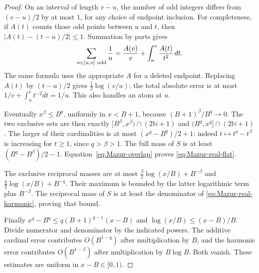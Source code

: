 \begin{proof}
On an interval of length \(v-u\), the number of odd integers differs
from \((v-u)/2\) by at most \(1\), for any choice of endpoint inclusion.
For completeness, if \(A(t)\) counts those odd points between \(u\)
and \(t\), then \(|A(t)-(t-u)/2|\le1\). Summation by parts gives
\[
 \sum_{n\in[u,v]\ {\rm odd}}\frac1n
 =\frac{A(v)}v+\int_u^v\frac{A(t)}{t^2}\,dt.
\]
The same formula uses the appropriate \(A\) for a deleted endpoint.
Replacing \(A(t)\) by \((t-u)/2\) gives
\(\tfrac12\log(v/u)\); the total absolute error is at most
\(1/v+\int_u^v t^{-2}dt=1/u\).
This also handles an atom at \(u\).

Eventually \(x^\beta\le B^q\), uniformly in \(x<B+1\), because
\((B+1)^\beta/B^q\to0\).
The two exclusive sets are then exactly
\([B^\beta,x^\beta)\cap(2\mathbb N+1)\) and
\((B^q,x^q]\cap(2\mathbb N+1)\).
The larger of their cardinalities is at most
\((x^q-B^q)/2+1\): indeed \(t\mapsto t^q-t^\beta\) is increasing
for \(t\ge1\), since \(q>\beta>1\).
The full mass of \(S\) is at least \((B^q-B^\beta)/2-1\).
Equation~\eqref{eq:Mazur-overlap} proves \eqref{eq:Mazur-real-flat}.

The exclusive reciprocal masses are at most
\(\frac{\beta}{2}\log(x/B)+B^{-\beta}\) and
\(\frac q2\log(x/B)+B^{-q}\).
Their maximum is bounded by the latter logarithmic term plus
\(B^{-\beta}\). The reciprocal mass of \(S\) is at least the
denominator of \eqref{eq:Mazur-real-harmonic}, proving that bound.

Finally \(x^q-B^q\le q(B+1)^{q-1}(x-B)\) and
\(\log(x/B)\le(x-B)/B\).
Divide numerator and denominator by the indicated powers.
The additive cardinal error contributes \(O(B^{1-q})\) after
multiplication by \(B\), and the harmonic error contributes
\(O(B^{1-\beta})\) after multiplication by \(B\log B\).
Both vanish. These estimates are uniform in \(x-B\in[0,1)\).
\end{proof}

